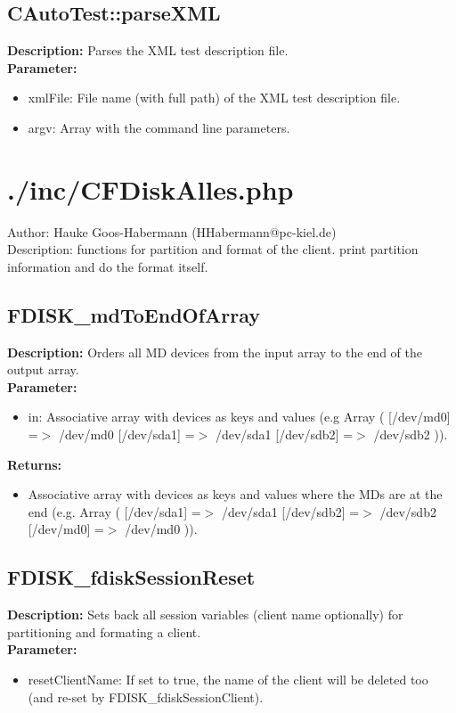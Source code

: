 \subsection{CAutoTest::parseXML}
\textbf{Description:} Parses the XML test description file.\\
\textbf{Parameter:}
\begin{itemize}
\item xmlFile: File name (with full path) of the XML test description file.
\item argv: Array with the command line parameters.
\end{itemize}

\newpage\section{./inc/CFDiskAlles.php}
 Author: Hauke Goos-Habermann (HHabermann@pc-kiel.de)\\
 Description: functions for partition and format of the client. print partition information and do the format itself.\\

\subsection{FDISK\_mdToEndOfArray}
\textbf{Description:} Orders all MD devices from the input array to the end of the output array.\\
\textbf{Parameter:}
\begin{itemize}
\item in: Associative array with devices as keys and values (e.g Array ( [/dev/md0] =$>$ /dev/md0 [/dev/sda1] =$>$ /dev/sda1 [/dev/sdb2] =$>$ /dev/sdb2 )).
\end{itemize}
\textbf{Returns:}
\begin{itemize}
\item Associative array with devices as keys and values where the MDs are at the end (e.g. Array ( [/dev/sda1] =$>$ /dev/sda1 [/dev/sdb2] =$>$ /dev/sdb2 [/dev/md0] =$>$ /dev/md0 )).
\end{itemize}

\subsection{FDISK\_fdiskSessionReset}
\textbf{Description:} Sets back all session variables (client name optionally) for partitioning and formating a client.\\
\textbf{Parameter:}
\begin{itemize}
\item resetClientName: If set to true, the name of the client will be deleted too (and re-set by FDISK\_fdiskSessionClient).
\end{itemize}


